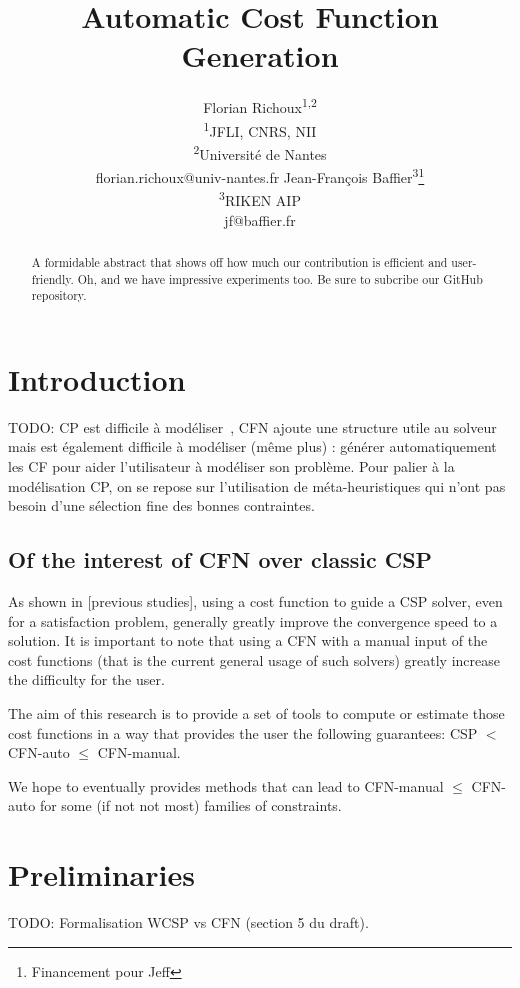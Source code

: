 \documentclass[letterpaper]{article} %
\title{Automatic Cost Function Generation}
\author{Florian Richoux\textsuperscript{\rm 1,2}\\
  \textsuperscript{\rm 1}JFLI, CNRS, NII\\
  \textsuperscript{\rm 2}Université de Nantes\\
florian.richoux@univ-nantes.fr %
\And Jean-Fran\c{c}ois Baffier\textsuperscript{\rm 3}\thanks{Financement pour Jeff}\\
\textsuperscript{\rm 3}RIKEN AIP\\
jf@baffier.fr %
}
\newcommand{\cfn}{\textsc{CFN}\xspace}
\begin{document}
\maketitle

\begin{abstract}
A formidable abstract that shows off how much our contribution is efficient and user-friendly. Oh, and we have impressive experiments too. Be sure to subcribe our GitHub repository.
\end{abstract}

\section{Introduction}\label{sec:introduction}

TODO: CP est difficile à modéliser~\cite{Puget2004,Wallace2003}, CFN ajoute une structure utile au
solveur  mais est  également  difficile à  modéliser  (même plus)  :
générer  automatiquement   les  CF  pour  aider   l'utilisateur  à
modéliser  son problème.  Pour palier  à la  modélisation CP,  on se
repose sur  l'utilisation de méta-heuristiques qui  n'ont pas besoin
d'une sélection fine des bonnes contraintes. \cite{AMJFH2011,Bessiere2015,CBLS}

\subsection{Of the interest of \cfn over classic CSP}
As shown in [previous studies], using a cost function to guide a CSP solver, even for a satisfaction problem, generally greatly improve the convergence speed to a solution.
It is important to note that using a \cfn with a manual input of the cost functions (that is the current general usage of such solvers) greatly increase the difficulty for the user.

The aim of this research is to provide a set of tools to compute or estimate those cost functions in a way that provides the user the following guarantees:
CSP $<$ CFN-auto $\leq$ CFN-manual.

We hope to eventually provides methods that can lead to CFN-manual $\leq$ CFN-auto for some (if not not most) families of constraints.



\section{Preliminaries}\label{sec:preliminaries}
TODO: Formalisation    WCSP     vs    CFN     (section    5     du
draft). \cite{Bessiere2011,LK2014}
\end{document}
